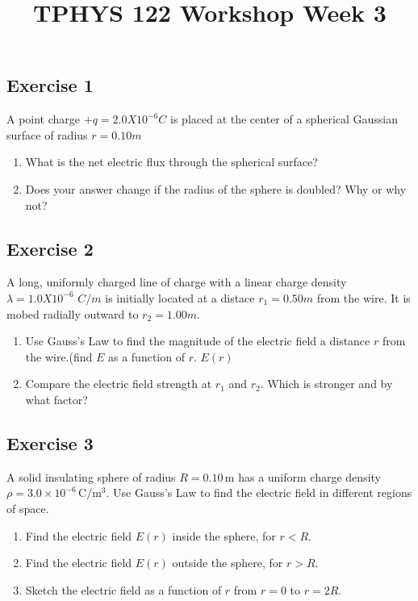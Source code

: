\documentclass[11pt]{article}
\title{TPHYS 122 Workshop Week 3}
\author{}
\date{\vspace{-5ex}}
\newenvironment{exercise}{
    \begin{mdframed}[style=problemstyle]\textcolor{black}{}
}{
    \end{mdframed}
}
\begin{document}
\maketitle
\vspace{-10ex}%

\subsection*{Exercise 1}
\begin{exercise}
    A point charge $+q = 2.0 X 10^{-6} C$ is placed at the center of a
    spherical Gaussian surface of radius $r = 0.10m$
    \begin{enumerate}[label={\alph*}]
        \item What is the net electric flux through the spherical surface? 
        \item Does your answer change if the radius of the sphere is doubled?
            Why or why not?
    \end{enumerate}
\end{exercise}

\subsection*{Exercise 2}
\begin{exercise}
    A long, uniformly charged line of charge with a linear charge density
    $\lambda = 1.0X10^{-6}$ $C/m$ is initially located at a distace 
    $r_{1} = 0.50m$ from the wire. It is mobed radially outward to 
    $r_{2} = 1.00m$.
    \begin{enumerate}[label={\alph*}]
        \item Use Gauss's Law to find the magnitude of the electric field a
        distance $r$ from the wire.(find $E$ as a function of $r$. $E(r)$
        \item Compare the electric field strength at $r_1$ and $r_2$. Which is
        stronger and by what factor?
    \end{enumerate}
\end{exercise}

\subsection*{Exercise 3}
\begin{exercise}
    A solid insulating sphere of radius $R = 0.10\,\mathrm{m}$ has 
    a uniform charge density $\rho = 3.0 \times 10^{-6}\,\mathrm{C/m^3}$. 
    Use Gauss’s Law to find the electric field in different regions of 
    space.
    \begin{enumerate}[label={\alph*}]
        \item Find the electric field $E(r)$ inside the sphere, for $r < R$.
        \item Find the electric field $E(r)$ outside the sphere, for $r > R$.
        \item Sketch the electric field as a function of $r$ from $r = 0$ 
            to $r = 2R$.
    \end{enumerate}
\end{exercise}
\end{document}
